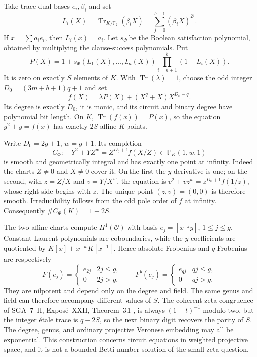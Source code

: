 Take trace-dual bases $e_i,\beta_i$ and set
\[
 L_i(X)=\operatorname{Tr}_{K/\mathbb F_2}(\beta_iX)
       =\sum_{j=0}^{b-1}(\beta_iX)^{2^j}.
\]
If $x=\sum a_ie_i$, then $L_i(x)=a_i$. Let $s_\Phi$ be the Boolean satisfaction polynomial, obtained by multiplying the clause-success polynomials. Put
\[
 P(X)=1+s_\Phi(L_1(X),\ldots,L_n(X))
                  \prod_{i=n+1}^b(1+L_i(X)).
\]
It is zero on exactly $S$ elements of $K$. With $\operatorname{Tr}(\lambda)=1$, choose the odd integer
$D_0=(3m+b+1)q+1$ and set
\[
 f(X)=\lambda P(X)+(X^q+X)X^{D_0-q}.
\]
Its degree is exactly $D_0$, it is monic, and its circuit and binary degree have polynomial bit length. On $K$, $\operatorname{Tr}(f(x))=P(x)$, so the equation $y^2+y=f(x)$ has exactly $2S$ affine $K$-points.

Write $D_0=2g+1$, $w=g+1$. Its completion
\[
 C_\Phi:\quad Y^2+YZ^w=Z^{D_0+1}f(X/Z)
       \subset\mathbb P_K(1,w,1)
\]
is smooth and geometrically integral and has exactly one point at infinity. Indeed the charts $Z\neq0$ and $X\neq0$ cover it. On the first the $y$ derivative is one; on the second, with $z=Z/X$ and $v=Y/X^w$, the equation is
$v^2+vz^w=z^{D_0+1}f(1/z)$, whose right side begins with $z$. The unique point $(z,v)=(0,0)$ is therefore smooth. Irreducibility follows from the odd pole order of $f$ at infinity. Consequently $\#C_\Phi(K)=1+2S$.

The two affine charts compute $H^1(\mathcal O)$ with basis
$e_j=[x^{-j}y]$, $1\leq j\leq g$. Constant Laurent polynomials are coboundaries, while the $y$-coefficients are quotiented by
$K[x]+x^{-w}K[x^{-1}]$. Hence absolute Frobenius and $q$-Frobenius are respectively
\[
 F(e_j)=\begin{cases}e_{2j}&2j\leq g,\\0&2j>g,\end{cases}
 \qquad
 F^b(e_j)=\begin{cases}e_{qj}&qj\leq g,\\0&qj>g.\end{cases}
\]
They are nilpotent and depend only on the degree and field. The same genus and field can therefore accompany different values of $S$. The coherent zeta congruence of SGA~7~II, Expos\'e~XXII, Theorem~3.1 \cite{ff-sga7}, is always $(1-t)^{-1}$ modulo two, but the integer \'etale trace is $q-2S$, so the next binary digit recovers the parity of $S$. The degree, genus, and ordinary projective Veronese embedding may all be exponential. This construction concerns circuit equations in weighted projective space, and it is not a bounded-Betti-number solution of the small-zeta question.

